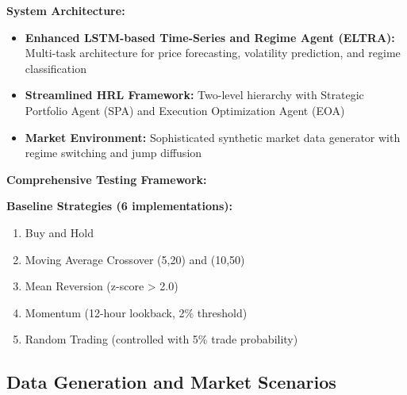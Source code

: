 \documentclass[11pt]{article}
\begin{document}
\textbf{System Architecture:}
\begin{itemize}
\item \textbf{Enhanced LSTM-based Time-Series and Regime Agent (ELTRA):} Multi-task architecture for price forecasting, volatility prediction, and regime classification
\item \textbf{Streamlined HRL Framework:} Two-level hierarchy with Strategic Portfolio Agent (SPA) and Execution Optimization Agent (EOA)
\item \textbf{Market Environment:} Sophisticated synthetic market data generator with regime switching and jump diffusion

\end{itemize}
\textbf{Comprehensive Testing Framework:}
\textbf{Baseline Strategies (6 implementations):}
\begin{enumerate}
\item Buy and Hold
\item Moving Average Crossover (5,20) and (10,50)
\item Mean Reversion (z-score > 2.0)
\item Momentum (12-hour lookback, 2\% threshold)
\item Random Trading (controlled with 5\% trade probability)

\end{enumerate}
\subsection{Data Generation and Market Scenarios}
\end{document}
